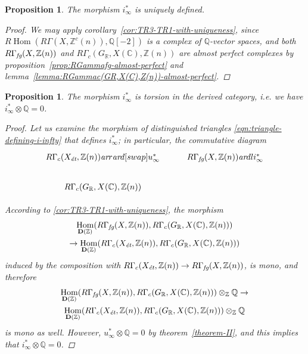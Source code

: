\documentclass[leqno,12pt]{article}
\theoremstyle{plain}
\newtheorem{proposition}[theorem]{\indent\sc Proposition}
\theoremstyle{definition}
\DeclareMathOperator{\Hom}{Hom}
\newcommand{\CC}{\mathbb{C}}
\newcommand{\QQ}{\mathbb{Q}}
\newcommand{\RR}{\mathbb{R}}
\newcommand{\ZZ}{\mathbb{Z}}
\newcommand{\ar}{\text{\it ar}}
\newcommand{\et}{\text{\it \'{e}t}}
\newcommand{\fg}{\text{\it fg}}
\newcommand{\RHom}{R\!\Hom}
\begin{document}
\begin{proposition}
  \label{prop:uniqueness-of-i-infty}
  The morphism $i_\infty^*$ is uniquely defined.

  \begin{proof}
    We may apply corollary~\ref{cor:TR3-TR1-with-uniqueness}, since
    $\RHom (R\Gamma (X, \ZZ^c (n)), \QQ [-2])$ is a complex of $\QQ$-vector
    spaces, and both
    $R\Gamma_\fg (X, \ZZ (n))$ and
    $R\Gamma_c (G_\RR, X (\CC), \ZZ (n))$
    are almost perfect complexes by
    proposition~\ref{prop:RGammafg-almost-perfect} and
    lemma~\ref{lemma:RGammac(GR,X(C),Z(n))-almost-perfect}.
  \end{proof}
\end{proposition}

\begin{proposition}
  \label{i-infty-is-torsion}
  The morphism $i_\infty^*$ is torsion in the derived category,
  i.e. we have $i_\infty^*\otimes \QQ = 0$.

  \begin{proof}
    Let us examine the morphism of distinguished triangles
    \eqref{eqn:triangle-defining-i-infty} that defines $i_\infty^*$; in
    particular, the commutative diagram
    \[ \begin{tikzcd}
      R\Gamma_c (X_\et, \ZZ (n)) \ar{r}\ar{d}[swap]{u_\infty^*} & R\Gamma_\fg (X, \ZZ (n))\ar{dl}{i_\infty^*} \\
      R\Gamma_c (G_\RR, X (\CC), \ZZ (n))
    \end{tikzcd} \]

    According to \ref{cor:TR3-TR1-with-uniqueness}, the morphism
    \begin{multline*}
      \Hom_{\mathbf{D} (\ZZ)} (R\Gamma_\fg (X,\ZZ (n)), R\Gamma_c (G_\RR, X (\CC), \ZZ (n))) \\
      \to
      \Hom_{\mathbf{D} (\ZZ)} (R\Gamma_c (X_\et, \ZZ (n)), R\Gamma_c (G_\RR, X (\CC), \ZZ (n)))
    \end{multline*}
    induced by the composition with
    $R\Gamma_c (X_\et, \ZZ (n)) \to R\Gamma_\fg (X,\ZZ (n))$, is mono, and
    therefore
    \begin{multline*}
      \Hom_{\mathbf{D} (\ZZ)} (R\Gamma_\fg (X,\ZZ (n)), R\Gamma_c (G_\RR, X (\CC), \ZZ (n)))\otimes_\ZZ \QQ \to\\
      \Hom_{\mathbf{D} (\ZZ)} (R\Gamma_c (X_\et, \ZZ (n)), R\Gamma_c (G_\RR, X (\CC), \ZZ (n)))\otimes_\ZZ \QQ
    \end{multline*}
    is mono as well. However, $u_\infty^*\otimes \QQ = 0$ by
    theorem~\ref{theorem-II}, and this implies that $i_\infty^*\otimes \QQ = 0$.
  \end{proof}
\end{proposition}
\end{document}
